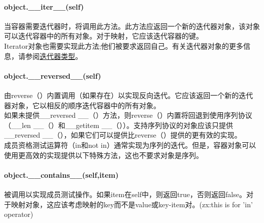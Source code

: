 \documentclass[10pt,UTF8]{ctexart}
\begin{document}
\begin{flushleft}
\paragraph{object.__iter__(self)}
当容器需要迭代器时，将调用此方法。此方法应返回一个新的迭代器对象，该对象可以迭代容器中的所有对象。对于映射，它应该迭代容器的键。\\
\indent Iterator对象也需要实现此方法;他们被要求返回自己。有关迭代器对象的更多信息，请参阅\href{https://docs.python.org/3/library/stdtypes.html#typeiter}{迭代器类型}。
\paragraph{object.__reversed__(self)}
由reverse（）内置调用（如果存在）以实现反向迭代。它应该返回一个新的迭代器对象，它以相反的顺序迭代容器中的所有对象。\\
\indent 如果未提供__reversed __（）方法，则reverse（）内置将回退到使用序列协议（__len __（）和__getitem __（））。支持序列协议的对象应该只提供__reversed __（），如果它们可以提供比reverse（）提供的更有效的实现。\\
\indent 成员资格测试运算符（in和not in）通常实现为序列的迭代。但是，容器对象可以使用更高效的实现提供以下特殊方法，这也不要求对象是序列。
\paragraph{object.__contains__(self,item)}
被调用以实现成员测试操作。如果item在self中，则返回true，否则返回false。对于映射对象，这应该考虑映射的key而不是value或key-item对。(zx:this is for 'in' operator)

\end{flushleft}
\end{document}
